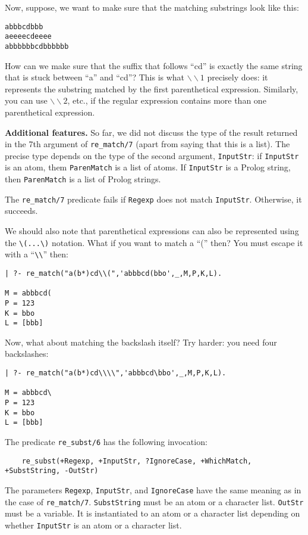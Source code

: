 Now, suppose, we want to make sure that the matching substrings look like this:
\begin{verbatim}
abbbcdbbb
aeeeecdeeee
abbbbbbcdbbbbbb
\end{verbatim}
How can we make sure that the suffix that follows ``cd'' is exactly the same
string that is stuck between ``a'' and ``cd''? This is what
$\backslash\backslash 1$ precisely does: it represents the substring
matched by the first parenthetical expression. Similarly, you can use
$\backslash\backslash 2$, etc., if the regular expression contains more
than one parenthetical expression.

{\bf Additional features.} So far, we did not discuss the type of the
result returned in the 7th argument of \verb|re_match/7| (apart from saying
that this is a list). The precise type depends on the type of the second
argument, {\tt InputStr}: if {\tt InputStr} is an atom, them {\tt ParenMatch} is a
list of atoms. If {\tt InputStr} is a Prolog string, then {\tt ParenMatch} is a
list of Prolog strings.

The \verb|re_match/7| predicate fails if {\tt Regexp} does not match {\tt InputStr}.
Otherwise, it succeeds.

We should also note that parenthetical expressions can also be represented
using the \verb|\(...\)| notation. What if you want to match a ``('' then?
You must escape it with a ``\verb|\\|'' then:
\begin{verbatim}
| ?- re_match("a(b*)cd\\(",'abbbcd(bbo',_,M,P,K,L).

M = abbbcd(
P = 123
K = bbo
L = [bbb]
\end{verbatim}
Now, what about matching the backslash itself? Try harder: you need four
backslashes: 
\begin{verbatim}
| ?- re_match("a(b*)cd\\\\",'abbbcd\bbo',_,M,P,K,L).

M = abbbcd\
P = 123
K = bbo
L = [bbb]  
\end{verbatim}

The predicate \verb|re_subst/6| has the following invocation:
\begin{verbatim}
    re_subst(+Regexp, +InputStr, ?IgnoreCase, +WhichMatch, +SubstString, -OutStr)  
\end{verbatim}
The parameters {\tt Regexp}, {\tt InputStr}, and {\tt IgnoreCase} have the
same meaning as in the case of \verb|re_match/7|. {\tt SubstString} must be
an atom or a character list. {\tt OutStr} must be a variable.
It is instantiated to an atom or a character list depending on whether
{\tt InputStr} is an atom or a character list.

